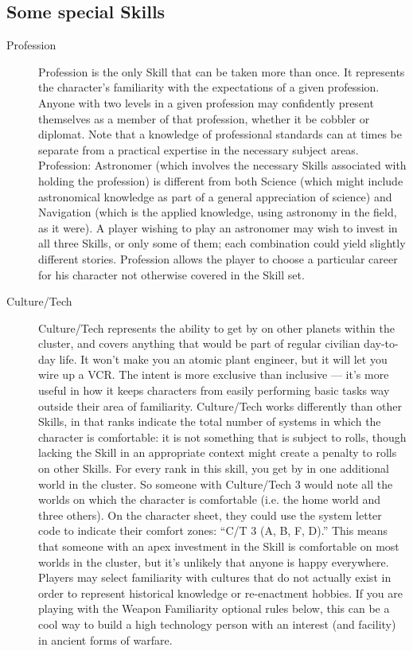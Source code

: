 \newpage
\subsection{Some special Skills}\label{sec:Some special Skills} %

\begin{description}
\item[Profession]
Profession is the only Skill that can be taken more than once. It represents the character's familiarity with the expectations of a given profession. Anyone with two levels in a given profession may confidently present themselves as a member of that profession, whether it be cobbler or diplomat. Note that a knowledge of professional standards can at times be separate from a practical expertise in the necessary subject areas. Profession: Astronomer (which involves the necessary Skills associated with holding the profession) is different from both Science (which might include astronomical knowledge as part of a general appreciation of science) and Navigation (which is the applied knowledge, using astronomy in the field, as it were). A player wishing to play an astronomer may wish to invest in all three Skills, or only some of them; each combination could yield slightly different stories. Profession allows the player to choose a particular career for his character not otherwise covered in the Skill set.

\item[Culture/Tech]
Culture/Tech represents the ability to get by on other planets within the cluster, and covers anything that would be part of regular civilian day-to-day life. It won't make you an atomic plant engineer, but it will let you wire up a VCR. The intent is more exclusive than inclusive --- it's more useful in how it keeps characters from easily performing basic tasks way outside their area of familiarity. Culture/Tech works differently than other Skills, in that ranks indicate the total number of systems in which the character is comfortable: it is not something that is subject to rolls, though lacking the Skill in an appropriate context might create a penalty to rolls on other Skills. For every rank in this skill, you get by in one additional world in the cluster. So someone with Culture/Tech 3 would note all the worlds on which the character is comfortable (i.e. the home world and three others). On the character sheet, they could use the system letter code to indicate their comfort zones: ``C/T 3 (A, B, F, D).'' This means that someone with an apex investment in the Skill is comfortable on most worlds in the cluster, but it's unlikely that anyone is happy everywhere. Players may select familiarity with cultures that do not actually exist in order to represent historical knowledge or re-enactment hobbies. If you are playing with the Weapon Familiarity optional rules below, this can be a cool way to build a high technology person with an interest (and facility) in ancient forms of warfare.


\end{description}

